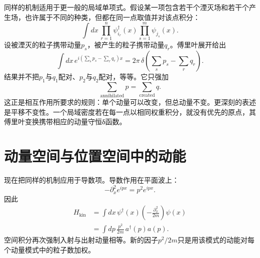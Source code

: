\begin{classroomqa}
\end{classroomqa}

同样的机制适用于更一般的局域单项式。假设某一项包含若干个湮灭场和若干个产生场，也许属于不同的种类，但都在同一点取值并对该点积分：
\begin{equation}
\int dx\,
\prod_{r=1}^{n} \psi_{i_r}^\dagger(x)
\prod_{s=1}^{m} \psi_{j_s}(x).
\end{equation}
设被湮灭的粒子携带动量\(p_s\)，被产生的粒子携带动量\(q_r\)。傅里叶展开给出
\begin{equation}
\int dx\,
e^{i(\sum_s p_s-\sum_r q_r)x}
=2\pi\,
\delta\!\left(\sum_s p_s-\sum_r q_r\right).
\label{eq:l9-total-momentum-delta}
\end{equation}
结果并不把\(p_1\)与\(q_1\)配对、\(p_2\)与\(q_2\)配对，等等。它只强加
\begin{equation}
\sum_{\mathrm{annihilated}}p
=
\sum_{\mathrm{created}}q.
\end{equation}
这正是相互作用所要求的规则：单个动量可以改变，但总动量不变。更深刻的表述是平移不变性。一个局域密度若在每一点以相同权重积分，就没有优先的原点，其傅里叶变换携带相应的动量守恒{\proseunicodefont δ}函数。

\begin{classroomqa}
\end{classroomqa}

\section{动量空间与位置空间中的动能}

现在把同样的机制应用于导数项。导数作用在平面波上：
\begin{equation}
-\partial_x^2 e^{ipx}=p^2e^{ipx}.
\end{equation}
因此
\begin{align}
H_{\mathrm{kin}}
&=\int dx\,\psi^\dagger(x)
\left(-\frac{\partial_x^2}{2m}\right)\psi(x)\\
&=\int dp\,\frac{p^2}{2m}\,a^\dagger(p)a(p).
\label{eq:l9-kinetic-momentum}
\end{align}
空间积分再次强制入射与出射动量相等。新的因子\(p^2/2m\)只是用该模式的动能对每个动量模式中的粒子数加权。

